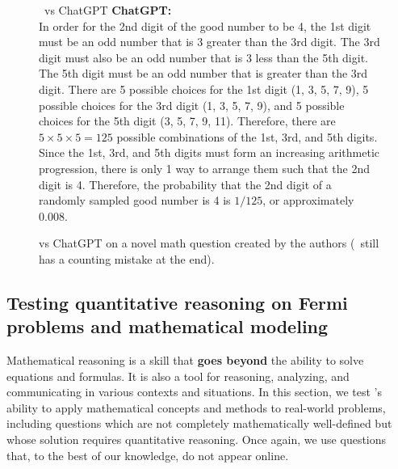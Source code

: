 \begin{figure}[H]
\begin{AIbox}{\DV \ vs ChatGPT}
{\bf ChatGPT:} \\
{\scriptsize
In order for the 2nd digit of the good number to be 4, the 1st digit must be an odd number that is 3 greater than the 3rd digit. The 3rd digit must also be an odd number that is 3 less than the 5th digit. The 5th digit must be an odd number that is greater than the 3rd digit.
There are 5 possible choices for the 1st digit (1, 3, 5, 7, 9), 5 possible choices for the 3rd digit (1, 3, 5, 7, 9), and 5 possible choices for the 5th digit (3, 5, 7, 9, 11). Therefore, there are $5 \times 5 \times 5 = 125$ possible combinations of the 1st, 3rd, and 5th digits.
Since the 1st, 3rd, and 5th digits must form an increasing arithmetic progression, there is only 1 way to arrange them such that the 2nd digit is 4. Therefore, the probability that the 2nd digit of a randomly sampled good number is 4 is $1/125$, or approximately 0.008.
}
\end{AIbox}
\caption{\DV vs ChatGPT on a novel math question created by the authors (\DV \ still has a counting mistake at the end).}
\end{figure}


\subsection{Testing quantitative reasoning on Fermi problems and mathematical modeling}
Mathematical reasoning is a skill that \textbf{goes beyond} the ability to solve equations and formulas. It is also a tool for reasoning, analyzing, and communicating in various contexts and situations. In this section, we test {\DV}'s ability to apply mathematical concepts and methods to real-world problems, including questions which are not completely mathematically well-defined but whose solution requires quantitative reasoning. Once again, we use questions that, to the best of our knowledge, do not appear online.

